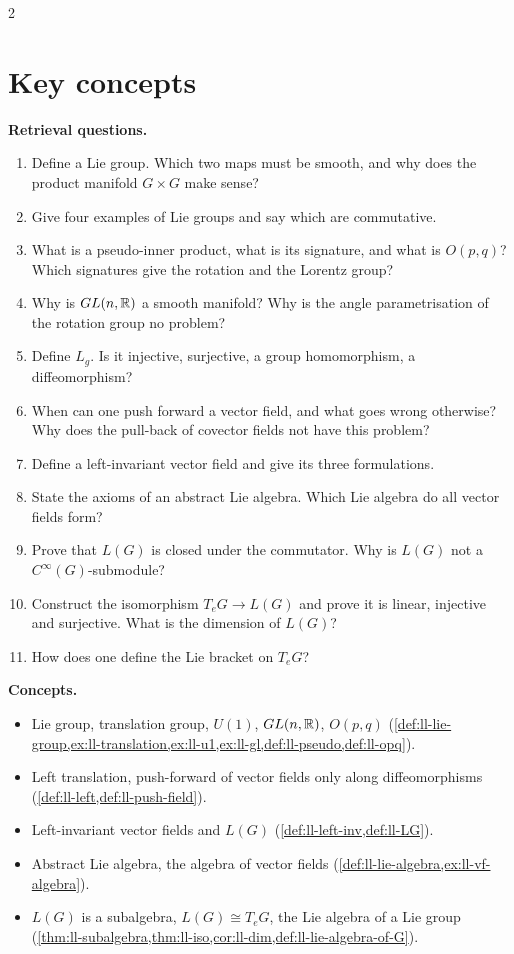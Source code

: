\begin{paracol}{2}
\section*{Key concepts}
\begin{keyconcepts}
\textbf{Retrieval questions.}
\begin{enumerate}
  \item Define a Lie group. Which two maps must be smooth, and why does the product manifold $G\times G$ make sense?
  \item Give four examples of Lie groups and say which are commutative.
  \item What is a pseudo-inner product, what is its signature, and what is $O(p,q)$? Which signatures give the rotation and the Lorentz group?
  \item Why is $GL(n,\mathbb{R})$ a smooth manifold? Why is the angle parametrisation of the rotation group no problem?
  \item Define $L_g$. Is it injective, surjective, a group homomorphism, a diffeomorphism?
  \item When can one push forward a vector field, and what goes wrong otherwise? Why does the pull-back of covector fields not have this problem?
  \item Define a left-invariant vector field and give its three formulations.
  \item State the axioms of an abstract Lie algebra. Which Lie algebra do all vector fields form?
  \item Prove that $L(G)$ is closed under the commutator. Why is $L(G)$ not a $C^\infty(G)$-submodule?
  \item Construct the isomorphism $T_eG\to L(G)$ and prove it is linear, injective and surjective. What is the dimension of $L(G)$?
  \item How does one define the Lie bracket on $T_eG$?
\end{enumerate}
\textbf{Concepts.}
\begin{itemize}
  \item Lie group, translation group, $U(1)$, $GL(n,\mathbb{R})$, $O(p,q)$ (\cref{def:ll-lie-group,ex:ll-translation,ex:ll-u1,ex:ll-gl,def:ll-pseudo,def:ll-opq}).
  \item Left translation, push-forward of vector fields only along diffeomorphisms (\cref{def:ll-left,def:ll-push-field}).
  \item Left-invariant vector fields and $L(G)$ (\cref{def:ll-left-inv,def:ll-LG}).
  \item Abstract Lie algebra, the algebra of vector fields (\cref{def:ll-lie-algebra,ex:ll-vf-algebra}).
  \item $L(G)$ is a subalgebra, $L(G)\cong T_eG$, the Lie algebra of a Lie group (\cref{thm:ll-subalgebra,thm:ll-iso,cor:ll-dim,def:ll-lie-algebra-of-G}).
\end{itemize}
\end{keyconcepts}

\flushside
\end{paracol}
